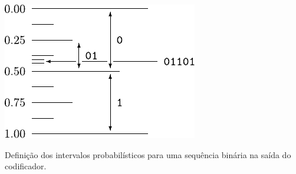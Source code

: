 \begin{marginfigure}%
  \includegraphics[width=\linewidth]{figures/acoding_binaryinvervals.pdf}
  \caption{Definição dos intervalos probabilísticos para uma sequência binária na saída do codificador.}\label{fig:acoding_binaryinvervals}
\end{marginfigure}





